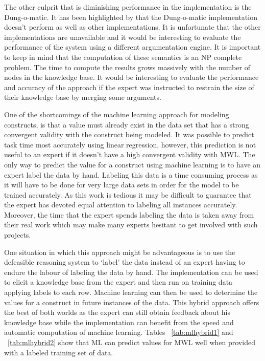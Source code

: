 The other culprit that is diminishing performance in the implementation is the Dung-o-matic. It has been highlighted by \cite{cerutti2014generating} that the Dung-o-matic implementation doesn't perform as well as other implementations. It is unfortunate that the other implementations are unavailable and it would be interesting to evaluate the performance of the system using a different argumentation engine. It is important to keep in mind that the computation of these semantics is an NP complete problem. The time to compute the results grows massively with the number of nodes in the knowledge base. It would be interesting to evaluate the performance and accuracy of the approach if the expert was instructed to restrain the size of their knowledge base by merging some arguments.

One of the shortcomings of the machine learning approach for modeling constructs, is that a value must already exist in the data set that has a strong convergent validity with the construct being modeled. It was possible to predict task time most accurately using linear regression, however, this prediction is not useful to an expert if it doesn't have a high convergent validity with MWL. The only way to predict the value for a construct using machine learning is to have an expert label the data by hand. Labeling this data is a time consuming process as it will have to be done for very large data sets in order for the model to be trained accurately. As this work is tedious it may be difficult to guarantee that the expert has devoted equal attention to labeling all instances accurately. Moreover, the time that the expert spends labeling the data is taken away from their real work which may make many experts hesitant to get involved with such projects.

One situation in which this approach might be advantageous is to use the defeasible reasoning system to `label' the data instead of an expert having to endure the labour of labeling the data by hand. The implementation can be used to elicit a knowledge base from the expert and then run on training data applying labels to each row. Machine learning can then be used to determine the values for a construct in future instances of the data. This hybrid approach offers the best of both worlds as the expert can still obtain feedback about his knowledge base while the implementation can benefit from the speed and automatic computation of machine learning. Tables ~\ref{tab:mlhybrid1} and ~\ref{tab:mlhybrid2} show that ML can predict values for MWL well when provided with a labeled training set of data.

